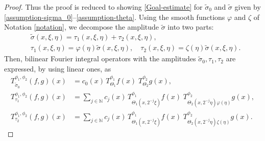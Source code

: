 \documentclass[12pt]{amsart}
\numberwithin{equation}{section}
\theoremstyle{plain}
\theoremstyle{definition}
\newcommand{\N}{\mathbb{N}}
\begin{document}
\begin{proof}
Thus the proof is reduced to showing \eqref{Goal-estimate} 
for $\widetilde{\sigma}_0$ and $\widetilde{\sigma}$ 
given by \eqref{assumption-sigma_0}--\eqref{assumption-theta}.
Using the smooth functions 
$\varphi$ and $\zeta$ 
of Notation \ref{notation}, 
we decompose the amplitude
$\widetilde{\sigma}$ into two parts:  
\begin{align*}
&
\widetilde{\sigma} (x, \xi, \eta)
=
\tau_1 (x, \xi, \eta) + \tau_2 (x, \xi, \eta) ,
\\
&
\tau_1 (x, \xi, \eta) = 
\varphi (\eta) \widetilde{\sigma} (x, \xi, \eta), 
\quad
\tau_2 (x, \xi, \eta) = 
\zeta (\eta) 
\widetilde{\sigma} (x, \xi, \eta) .  
\end{align*}
Then,
bilinear Fourier integral operators with 
the amplitudes
$\widetilde{\sigma}_0, \tau_1, \tau_2$
are expressed,
by using linear ones,
as
\begin{align}
\label{T_0}
T_{ \widetilde{\sigma}_0 }^{\phi_1, \phi_2} (f, g)(x)
&=
c_{0} (x) \,
T^{\phi_1}_{ \Theta_{1} } f(x) \;
T^{\phi_2}_{ \Theta_{2} } g(x), 
\\ 
\label{T_tau1}
T_{ \tau_1 }^{\phi_1, \phi_2} (f, g)(x)
&= \sum_{j \in \N } 
c_{j} (x) \,
T^{\phi_1}_{ \Theta_{1} (x, 2^{-j} \xi) } f(x) \;
T^{\phi_2}_{ \Theta_{2} (x, 2^{-j} \eta) \varphi(\eta) } g(x), 
\\ 
\label{T_tau2}
T_{ \tau_2 }^{\phi_1, \phi_2} (f, g)(x)
&= \sum_{j \in \N } 
c_{j} (x) \,
T^{\phi_1}_{ \Theta_{1} (x, 2^{-j} \xi) } f(x) \;
T^{\phi_2}_{ \Theta_{2} (x, 2^{-j} \eta) \zeta(\eta) } g(x).
\end{align}



\end{proof}
\end{document}
